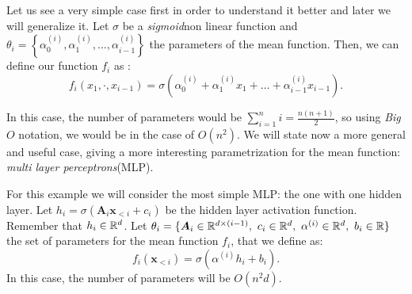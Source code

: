 Let us see a very simple case first in order to understand it better and later we will generalize it. Let $\sigma$ be a \emph{sigmoid}\footnotemark non linear function and 
$\theta_i = \left\{\alpha_{0}^{(i)},\alpha_{1}^{(i)},\dots, \alpha_{i-1}^{(i)}\right\}$ the parameters of the mean function. Then, we can define our function $f_i$ as :
$$
f_i(x_1,\cdot, x_{i-1}) = \sigma(\alpha_{0}^{(i)} + \alpha_{1}^{(i)}x_1 + \dots + \alpha_{i-1}^{(i)}x_{i-1}).
$$

In this case, the number of parameters would be $\sum_{i = 1}^n i = \frac{n(n+1)}{2}$, so using \emph{Big }$O$ notation, we would be in the case of $O(n^2)$. We will state now a more general and useful case,
giving a more interesting parametrization for the mean function: \emph{multi layer perceptrons}\footnotemark (MLP).


For this example we will consider the most simple MLP: the one with one hidden layer. Let $h_i = \sigma(\bm{A}_i \bm{x}_{<i} + c_i)$ be the hidden layer activation function. Remember that $h_i \in \mathbb{R}^d$. Let
$ \theta_i = \{ \bm{A}_i \in \R^{d \times (i-1)}, \ c_i \in \R^d, \ \alpha^{(i)} \in \R^d, \ b_i \in \R\}$ the set of parameters
for the mean function $f_i$, that we define as:
$$
f_i(\bm{x}_{<i}) = \sigma(\alpha^{(i)}h_i + b_i).
$$
In this case, the number of parameters will be $O(n^2 d)$.
